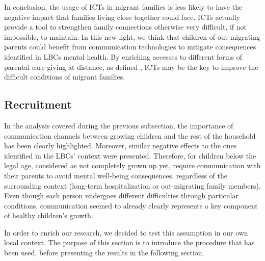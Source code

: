 In conclusion, the usage of ICTs in migrant families is less likely to have the negative impact that families living close together could face. ICTs actually provide a tool to strengthen family connections otherwise very difficult, if not impossible, to maintain. In this new light, we think that children of out-migrating parents could benefit from communication technologies to mitigate consequences identified in LBCs mental health. By enriching accesses to different forms of parental care-giving at distance, as defined \textcite{finch1989family}, ICTs may be the key to improve the difficult conditions of migrant families.

\subsection{Recruitment}
\label{methods-recruitment}
In the analysis covered during the previous subsection, the importance of communication channels between growing children and the rest of the household has been clearly highlighted. Moreover, similar negative effects to the ones identified in the LBCs' context were presented. Therefore, for children below the legal age, considered as not completely grown up yet, require communication with their parents to avoid mental well-being consequences, regardless of the surrounding context (long-term hospitalization or out-migrating family members). Even though each person undergoes different difficulties through particular conditions, communication seemed to already clearly represents a key component of healthy children's growth.

In order to enrich our research, we decided to test this assumption in our own local context. The purpose of this section is to introduce the procedure that has been used, before presenting the results in the following section.

